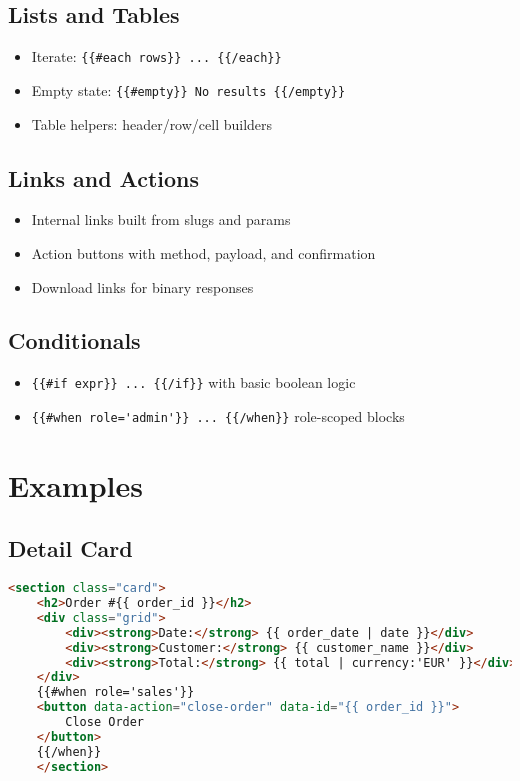 \subsection{Lists and Tables}
\begin{itemize}
	\item Iterate: \verb|{{#each rows}} ... {{/each}}|
	\item Empty state: \verb|{{#empty}} No results {{/empty}}|
	\item Table helpers: header/row/cell builders
\end{itemize}

\subsection{Links and Actions}
\begin{itemize}
	\item Internal links built from slugs and params
	\item Action buttons with method, payload, and confirmation
	\item Download links for binary responses
\end{itemize}

\subsection{Conditionals}
\begin{itemize}
	\item \verb|{{#if expr}} ... {{/if}}| with basic boolean logic
	\item \verb|{{#when role='admin'}} ... {{/when}}| role-scoped blocks
\end{itemize}

\section{Examples}
\label{sec:wbll-examples}

\subsection{Detail Card}
\begin{lstlisting}[language=HTML,caption={WBLL detail card (illustrative)}]
<section class="card">
	<h2>Order #{{ order_id }}</h2>
	<div class="grid">
		<div><strong>Date:</strong> {{ order_date | date }}</div>
		<div><strong>Customer:</strong> {{ customer_name }}</div>
		<div><strong>Total:</strong> {{ total | currency:'EUR' }}</div>
	</div>
	{{#when role='sales'}}
	<button data-action="close-order" data-id="{{ order_id }}">
		Close Order
	</button>
	{{/when}}
	</section>
\end{lstlisting}

